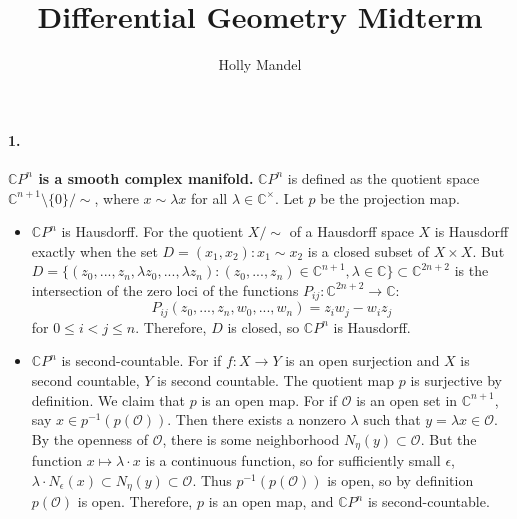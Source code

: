\documentclass[10pt,letter]{article}
\begin{document}
\title{Differential Geometry Midterm}
\author{Holly Mandel}
\maketitle 

\paragraph*{1.} \textbf{$\mathbb{C}P^n$ is a smooth complex manifold.} $\mathbb{C}P^n$ is defined as the quotient space $\mathbb{C}^{n+1} \setminus \lbrace 0 \rbrace/\sim$, where $x \sim \lambda x$ for all $\lambda \in \mathbb{C}^\times$. Let $p$ be the projection map. 
\begin{itemize}
\item $\mathbb{C}P^n$ is Hausdorff. For the quotient $X / \sim$ of a Hausdorff space $X$ is Hausdorff exactly when the set $D = (x_1,x_2): x_1 \sim x_2$ is a closed subset of $X \times X$. But $D = \lbrace(z_0,...,z_n,\lambda z_0,...,\lambda z_n ) : (z_0,...,z_n) \in \mathbb{C}^{n+1}, \lambda \in \mathbb{C} \rbrace \subset \mathbb{C}^{2n+2}$ is the intersection of the zero loci of the functions $P_{ij}: \mathbb{C}^{2n+2} \rightarrow \mathbb{C}$:  
\begin{equation*}
P_{ij}(z_0,...,z_n,w_0,...,w_n) =  z_iw_j - w_iz_j 
\end{equation*}
for $0 \leq i < j \leq n$. Therefore, $D$ is closed, so $\mathbb{C}P^n$ is Hausdorff. 

\item $\mathbb{C}P^n$ is second-countable. For if $f: X \rightarrow Y$ is an open surjection and $X$ is second countable, $Y$ is second countable. The quotient map $p$ is surjective by definition. We claim that $p$ is an open map. For if $\mathcal{O}$ is an open set in $\mathbb{C}^{n+1}$, say $x \in p^{-1}(p(\mathcal{O}))$. Then there exists a nonzero $\lambda$ such that $y = \lambda x \in \mathcal{O}$. By the openness of $\mathcal{O}$, there is some neighborhood $N_{\eta}(y) \subset \mathcal{O}$. But the function $x \mapsto \lambda \cdot x$ is a continuous function, so for sufficiently small $\epsilon$, $\lambda \cdot N_{\epsilon}(x) \subset N_{\eta}(y) \subset \mathcal{O}$. Thus $p^{-1}(p(\mathcal{O}))$ is open, so by definition $p(\mathcal{O})$ is open.  Therefore, $p$ is an open map, and $\mathbb{C}P^n$ is second-countable. 
\end{itemize}
\end{document}
